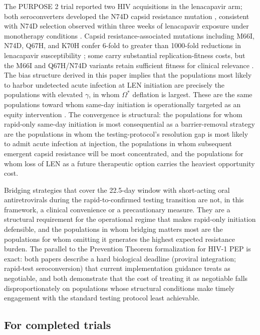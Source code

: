 \documentclass[12pt]{article}
\begin{document}
The PURPOSE 2 trial reported two HIV acquisitions in the lenacapavir arm; both seroconverters developed the N74D capsid resistance mutation \cite{kelley2025,who2025}, consistent with N74D selection observed within three weeks of lenacapavir exposure under monotherapy conditions \cite{wirden2024}. Capsid resistance-associated mutations including M66I, N74D, Q67H, and K70H confer 6-fold to greater than 1000-fold reductions in lenacapavir susceptibility \cite{pennetzdorfer2026,briganti2025}; some carry substantial replication-fitness costs, but the M66I and Q67H/N74D variants retain sufficient fitness for clinical relevance \cite{pennetzdorfer2026}. The bias structure derived in this paper implies that the populations most likely to harbor undetected acute infection at LEN initiation are precisely the populations with elevated $\gamma$, in whom $\Omega^*$ deflation is largest. These are the same populations toward whom same-day initiation is operationally targeted as an equity intervention \cite{tanner2025}. The convergence is structural: the populations for whom rapid-only same-day initiation is most consequential as a barrier-removal strategy are the populations in whom the testing-protocol's resolution gap is most likely to admit acute infection at injection, the populations in whom subsequent emergent capsid resistance will be most concentrated, and the populations for whom loss of LEN as a future therapeutic option carries the heaviest opportunity cost.

Bridging strategies that cover the 22.5-day window with short-acting oral antiretrovirals during the rapid-to-confirmed testing transition are not, in this framework, a clinical convenience or a precautionary measure. They are a structural requirement for the operational regime that makes rapid-only initiation defensible, and the populations in whom bridging matters most are the populations for whom omitting it generates the highest expected resistance burden. The parallel to the Prevention Theorem formalization for HIV-1 PEP \cite{demidont_finite} is exact: both papers describe a hard biological deadline (proviral integration; rapid-test seroconversion) that current implementation guidance treats as negotiable, and both demonstrate that the cost of treating it as negotiable falls disproportionately on populations whose structural conditions make timely engagement with the standard testing protocol least achievable.

\subsection{For completed trials}
\end{document}
